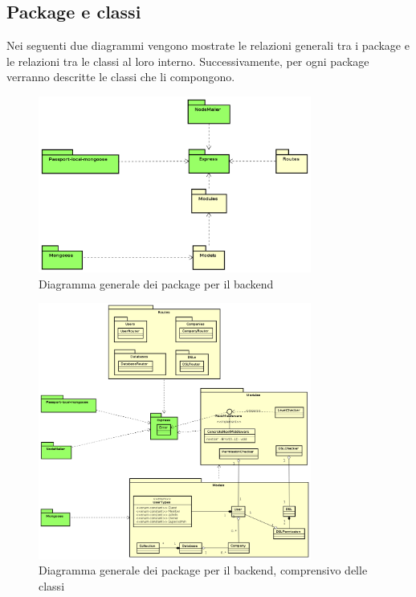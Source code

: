 \subsection{Package e classi}
Nei seguenti due diagrammi vengono mostrate le relazioni generali tra i package e le relazioni tra le classi al loro interno. Successivamente, per ogni package verranno descritte le classi che li compongono.
\begin{figure}[h]
\centering
\includegraphics[width=0.8\textwidth]{res/sections/backend/package.png}
\caption{Diagramma generale dei package per il backend}
\end{figure}
\newpage
\begin{figure}[h]
\centering
\includegraphics[width=0.8\textwidth]{res/sections/backend/packageWithClasses.png}
\caption{Diagramma generale dei package per il backend, comprensivo delle classi}
\end{figure}
